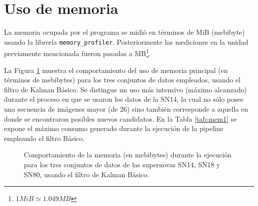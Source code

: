 \section{Uso de memoria}

La memoria ocupada por el programa se midi\'o en t\'erminos de MiB (mebibyte) usando la librer\'ia \texttt{memory\_profiler}. Posteriormente las mediciones en la unidad previamente mencionada fueron pasadas a MB\footnote{$1MiB\simeq 1.049MB$ }.
\bigskip

La Figura \ref{fig:mem_kbf} muestra el comportamiento del uso de memoria principal (en t\'erminos de mebibytes) para los tres conjuntos de datos empleados, usando el filtro de Kalman B\'asico. Se distingue un uso m\'as intensivo (m\'aximo alcanzado) durante el proceso en que se usaron los datos de la SN14, la cual no s\'olo posee una secuencia de im\'agenes mayor (de 26) sino tambi\'en corresponde a aquella en donde se encontraron posibles nuevos candidatos. En la Tabla \ref{tab:mem1} se expone el m\'aximo consumo generado durante la ejecuci\'on de la pipeline empleando el filtro B\'asico.
\bigskip

\begin{figure}[h!]
\centering
{}\hfill
{}\vfill
{}
\caption{Comportamiento de la memoria (en mebibytes) durante la ejecuci\'on para los tres conjuntos de datos  de las supernovas SN14, SN18 y SN80, usando el filtro de Kalman B\'asico.}
\label{fig:mem_kbf}
\end{figure}

